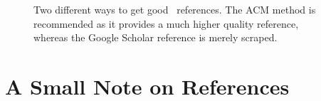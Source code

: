 \begin{figure}

  \caption[Getting good \mBibTeX\ references]{Two different ways to get good \mBibTeX\ references. The ACM method is recommended as it provides a much higher quality reference, whereas the Google Scholar reference is merely scraped.}\label{fig:bibtex}
\end{figure}


\section{A Small Note on References}
\label{sec:small-note-refer}


